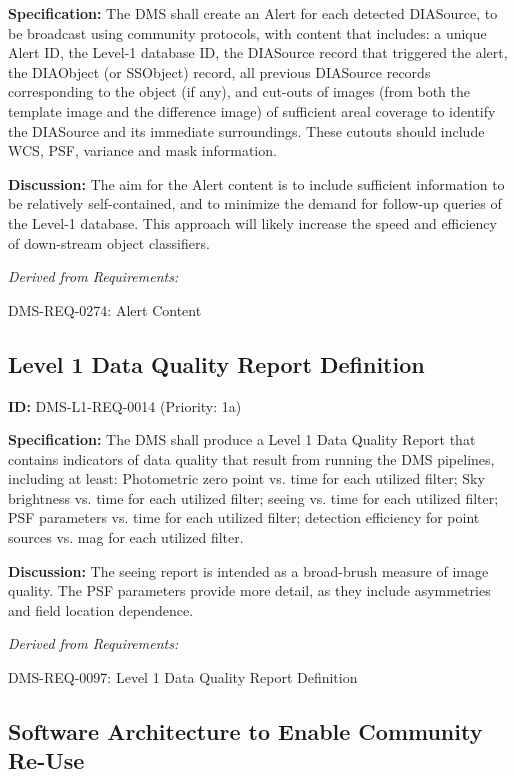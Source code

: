 \documentclass[SE,toc,lsstdraft]{lsstdoc}
\begin{document}
\textbf{Specification:} The DMS shall create an Alert for each detected DIASource, to be broadcast using community protocols, with content that includes: a unique Alert ID, the Level-1 database ID, the DIASource record that triggered the alert, the DIAObject (or SSObject) record, all previous DIASource records corresponding to the object (if any), and cut-outs of images (from both the template image and the difference image) of sufficient areal coverage to identify the DIASource and its immediate surroundings. These cutouts should include WCS, PSF, variance and mask information.

\textbf{Discussion: }The aim for the Alert content is to include sufficient information to be relatively self-contained, and to minimize the demand for follow-up queries of the Level-1 database. This approach will likely increase the speed and efficiency of down-stream object classifiers.

\emph{Derived from Requirements:}

DMS-REQ-0274:
Alert Content \newline

\subsection{Level 1 Data Quality Report Definition}

\label{DMS-L1-REQ-0014}
\textbf{ID:} DMS-L1-REQ-0014 (Priority: 1a)

\textbf{Specification:} The DMS shall produce a Level 1 Data Quality Report that contains indicators of data quality that result from running the DMS pipelines, including at least: Photometric zero point vs. time for each utilized filter; Sky brightness vs. time for each utilized filter; seeing vs. time for each utilized filter; PSF parameters vs. time for each utilized filter; detection efficiency for point sources vs. mag for each utilized filter.

\textbf{Discussion:} The seeing report is intended as a broad-brush measure of image quality.  The PSF parameters provide more detail, as they include asymmetries and field location dependence.

\emph{Derived from Requirements:}

DMS-REQ-0097:
Level 1 Data Quality Report Definition \newline

\subsection{Software Architecture to Enable Community Re-Use}
\end{document}
